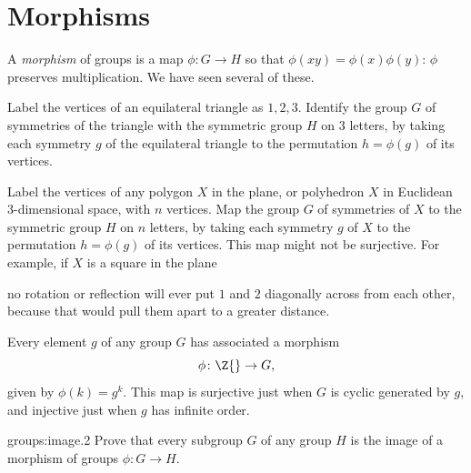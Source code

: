 \section{Morphisms}
A \emph{morphism} of groups is a map \(\phi \colon G \to H\) so that \(\phi(xy)=\phi(x)\phi(y)\): \(\phi\) preserves multiplication. 
We have seen several of these.
\begin{example}
Label the vertices of an equilateral triangle as \(1,2,3\).
Identify the group \(G\) of symmetries of the triangle with the symmetric group \(H\) on 3 letters, by taking each symmetry \(g\) of the equilateral triangle to the permutation \(h=\phi(g)\) of its vertices.
\end{example}
\begin{example}
Label the vertices of any polygon \(X\) in the plane, or polyhedron \(X\) in Euclidean 3-dimensional space, with \(n\) vertices.
Map the group \(G\) of symmetries of \(X\) to the symmetric group \(H\) on \(n\) letters, by taking each symmetry \(g\) of \(X\) to the permutation \(h=\phi(g)\) of its vertices.
This map might not be surjective.
For example, if \(X\) is a square in the plane
\begin{center}

\end{center}
no rotation or reflection will ever put \(1\) and \(2\) diagonally across from each other, because that would pull them apart to a greater distance.
\end{example}
\begin{example}
Every element \(g\) of any group \(G\) has associated a morphism
\[
\phi \colon \Z{} \to G,
\]
given by \(\phi(k)=g^k\).
This map is surjective just when \(G\) is cyclic generated by \(g\), and injective just when \(g\) has infinite order.
\end{example}

\begin{problem}{groups:image.2}
Prove that every subgroup \(G\) of any group \(H\) is the image of a morphism of groups \(\phi \colon G \to H\).
\end{problem}

